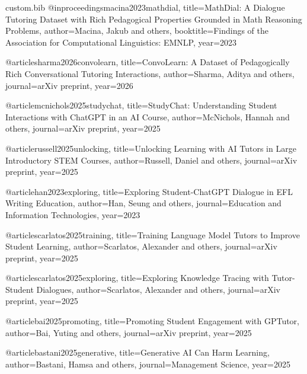 \begin{filecontents*}{custom.bib}
@inproceedings{macina2023mathdial,
  title={MathDial: A Dialogue Tutoring Dataset with Rich Pedagogical Properties Grounded in Math Reasoning Problems},
  author={Macina, Jakub and others},
  booktitle={Findings of the Association for Computational Linguistics: EMNLP},
  year={2023}
}

@article{sharma2026convolearn,
  title={ConvoLearn: A Dataset of Pedagogically Rich Conversational Tutoring Interactions},
  author={Sharma, Aditya and others},
  journal={arXiv preprint},
  year={2026}
}

@article{mcnichols2025studychat,
  title={StudyChat: Understanding Student Interactions with ChatGPT in an AI Course},
  author={McNichols, Hannah and others},
  journal={arXiv preprint},
  year={2025}
}

@article{russell2025unlocking,
  title={Unlocking Learning with AI Tutors in Large Introductory STEM Courses},
  author={Russell, Daniel and others},
  journal={arXiv preprint},
  year={2025}
}

@article{han2023exploring,
  title={Exploring Student-ChatGPT Dialogue in EFL Writing Education},
  author={Han, Seung and others},
  journal={Education and Information Technologies},
  year={2023}
}

@article{scarlatos2025training,
  title={Training Language Model Tutors to Improve Student Learning},
  author={Scarlatos, Alexander and others},
  journal={arXiv preprint},
  year={2025}
}

@article{scarlatos2025exploring,
  title={Exploring Knowledge Tracing with Tutor-Student Dialogues},
  author={Scarlatos, Alexander and others},
  journal={arXiv preprint},
  year={2025}
}

@article{bai2025promoting,
  title={Promoting Student Engagement with GPTutor},
  author={Bai, Yuting and others},
  journal={arXiv preprint},
  year={2025}
}

@article{bastani2025generative,
  title={Generative AI Can Harm Learning},
  author={Bastani, Hamsa and others},
  journal={Management Science},
  year={2025}
}
\end{filecontents*}

\documentclass[11pt,twocolumn]{article}

\usepackage[margin=1in]{geometry}
\usepackage[T1]{fontenc}
\usepackage[utf8]{inputenc}
\usepackage{times}
\usepackage{latexsym}
\usepackage{microtype}
\usepackage{url}
\usepackage[hidelinks]{hyperref}
\usepackage{enumitem}
\usepackage{natbib}
\usepackage{indentfirst}
\usepackage{booktabs}
\usepackage{multirow}
\usepackage{graphicx}
\usepackage{subcaption}
\usepackage{amsmath}
\usepackage{listings}
\usepackage{float}
\usepackage{placeins}
\usepackage{dblfloatfix}

